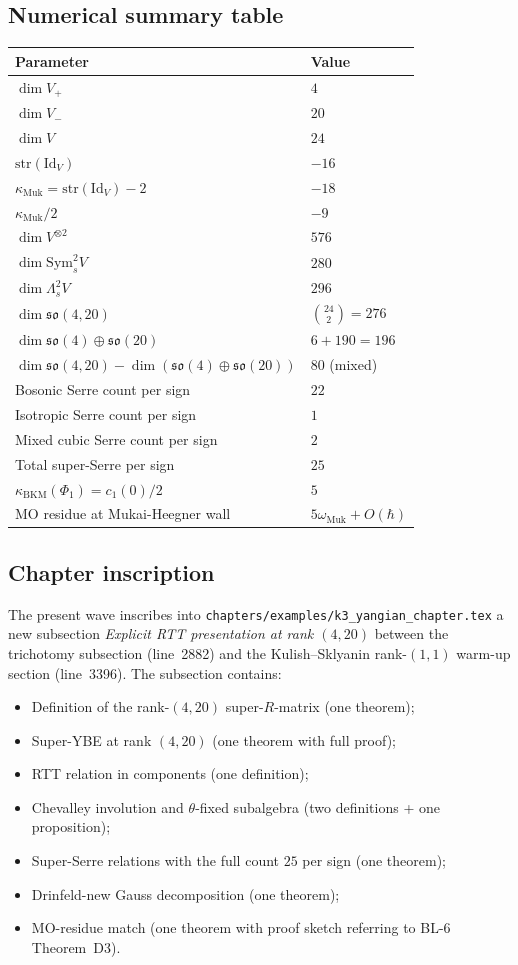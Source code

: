 \documentclass{article}
\providecommand{\fso}{\mathfrak{so}}
\providecommand{\Id}{\mathrm{Id}}
\providecommand{\str}{\mathrm{str}}
\providecommand{\Sym}{\mathrm{Sym}}
\providecommand{\kBKM}{\kappa_{\mathrm{BKM}}}
\theoremstyle{definition}
\begin{document}
\subsection{Numerical summary table}

\begin{tabular}{ll}
Parameter & Value \\
\hline
$\dim V_+$ & $4$ \\
$\dim V_-$ & $20$ \\
$\dim V$ & $24$ \\
$\str(\Id_V)$ & $-16$ \\
$\kappa_{\mathrm{Muk}} = \str(\Id_V) - 2$ & $-18$ \\
$\kappa_{\mathrm{Muk}}/2$ & $-9$ \\
$\dim V^{\otimes 2}$ & $576$ \\
$\dim \Sym^2_s V$ & $280$ \\
$\dim \Lambda^2_s V$ & $296$ \\
$\dim \fso(4, 20)$ & $\binom{24}{2} = 276$ \\
$\dim \fso(4) \oplus \fso(20)$ & $6 + 190 = 196$ \\
$\dim \fso(4, 20) - \dim(\fso(4) \oplus \fso(20))$ & $80$ (mixed) \\
Bosonic Serre count per sign & $22$ \\
Isotropic Serre count per sign & $1$ \\
Mixed cubic Serre count per sign & $2$ \\
Total super-Serre per sign & $25$ \\
$\kBKM(\Phi_1) = c_1(0)/2$ & $5$ \\
MO residue at Mukai-Heegner wall & $5 \omega_{\mathrm{Muk}} + O(\hbar)$ \\
\end{tabular}

\subsection{Chapter inscription}

The present wave inscribes into
\texttt{chapters/examples/k3\_yangian\_chapter.tex} a new subsection
\emph{Explicit RTT presentation at rank $(4, 20)$} between the
trichotomy subsection (line~2882) and the Kulish--Sklyanin
rank-$(1,1)$ warm-up section (line~3396). The subsection contains:
\begin{itemize}
\item Definition of the rank-$(4,20)$ super-$R$-matrix (one theorem);
\item Super-YBE at rank $(4, 20)$ (one theorem with full proof);
\item RTT relation in components (one definition);
\item Chevalley involution and $\theta$-fixed subalgebra (two
  definitions + one proposition);
\item Super-Serre relations with the full count $25$ per sign (one
  theorem);
\item Drinfeld-new Gauss decomposition (one theorem);
\item MO-residue match (one theorem with proof sketch referring to
  BL-6 Theorem~D3).
\end{itemize}
\end{document}
